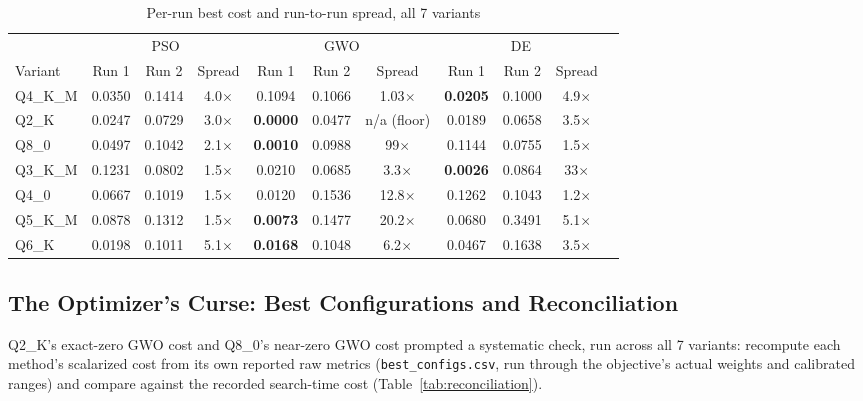 \documentclass[conference, letterpaper]{IEEEtran}
\begin{document}
\begin{table}[t]
\caption{Per-run best cost and run-to-run spread, all 7 variants}
\label{tab:phase2-robustness-summary}
\centering
\footnotesize
\begin{tabular}{@{}lcccccccccc@{}}
\toprule
& \multicolumn{3}{c}{PSO} & \multicolumn{3}{c}{GWO} & \multicolumn{3}{c}{DE} \\
\cmidrule(lr){2-4}\cmidrule(lr){5-7}\cmidrule(lr){8-10}
Variant & Run 1 & Run 2 & Spread & Run 1 & Run 2 & Spread & Run 1 & Run 2 & Spread \\
\midrule
Q4\_K\_M & 0.0350 & 0.1414 & 4.0$\times$ & 0.1094 & 0.1066 & 1.03$\times$ & \textbf{0.0205} & 0.1000 & 4.9$\times$ \\
Q2\_K    & 0.0247 & 0.0729 & 3.0$\times$ & \textbf{0.0000} & 0.0477 & n/a (floor) & 0.0189 & 0.0658 & 3.5$\times$ \\
Q8\_0    & 0.0497 & 0.1042 & 2.1$\times$ & \textbf{0.0010} & 0.0988 & 99$\times$ & 0.1144 & 0.0755 & 1.5$\times$ \\
Q3\_K\_M & 0.1231 & 0.0802 & 1.5$\times$ & 0.0210 & 0.0685 & 3.3$\times$ & \textbf{0.0026} & 0.0864 & 33$\times$ \\
Q4\_0    & 0.0667 & 0.1019 & 1.5$\times$ & 0.0120 & 0.1536 & 12.8$\times$ & 0.1262 & 0.1043 & 1.2$\times$ \\
Q5\_K\_M & 0.0878 & 0.1312 & 1.5$\times$ & \textbf{0.0073} & 0.1477 & 20.2$\times$ & 0.0680 & 0.3491 & 5.1$\times$ \\
Q6\_K    & 0.0198 & 0.1011 & 5.1$\times$ & \textbf{0.0168} & 0.1048 & 6.2$\times$ & 0.0467 & 0.1638 & 3.5$\times$ \\
\bottomrule
\end{tabular}
\end{table}

\subsection{The Optimizer's Curse: Best Configurations and Reconciliation}
\label{sec:best-configs}

Q2\_K's exact-zero GWO cost and Q8\_0's near-zero GWO cost prompted a systematic check, run across all 7 variants: recompute each method's scalarized cost from its own reported raw metrics (\texttt{best\_configs.csv}, run through the objective's actual weights and calibrated ranges) and compare against the recorded search-time cost (Table~\ref{tab:reconciliation}).
\end{document}
